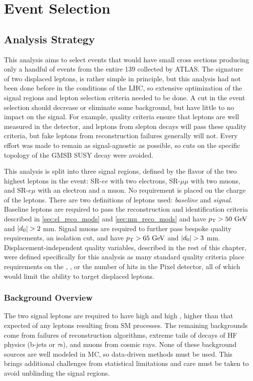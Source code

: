 \chapter{Event Selection}
\label{chap:eventselection}

\section{Analysis Strategy}

This analysis aims to select events that would have small cross sections producing only a handful of events from the entire 139 \ifb collected by \ac{ATLAS}. The signature of two displaced leptons, is rather simple in principle, but this analysis had not been done before in the conditions of the \ac{LHC}, so extensive optimization of the signal regions and lepton selection criteria needed to be done. A cut in the event selection should decrease or eliminate some background, but have little to no impact on the signal. For example, quality criteria ensure that leptons are well measured in the detector, and leptons from slepton decays will pass these quality criteria, but fake leptons from reconstruction failures generally will not. Every effort was made to remain as signal-agnostic as possible, so cuts on the specific topology of the \ac{GMSB} \ac{SUSY} decay were avoided. 

This analysis is split into three signal regions, defined by the flavor of the two highest \pt leptons in the event: SR-$ee$ with two electrons, SR-$\mu\mu$ with two muons, and SR-$e\mu$ with an electron and a muon. No requirement is placed on the charge of the leptons.
There are two definitions of leptons used: \emph{baseline} and \emph{signal}. Baseline leptons are required to pass the reconstruction and identification criteria described in \autoref{sec:el_reco_mods} and \autoref{sec:mu_reco_mods} and have $\pt > 50 \GeV$ and $|d_0| > 2$ mm. Signal muons are required to further pass bespoke quality requirements, an isolation cut, and have $\pt > 65 \GeV$ and $|d_0| > 3$ mm. Displacement-independent quality variables, described in the rest of this chapter, were defined specifically for this analysis as many standard quality criteria place requirements on the \absdz, \absz, or the number of hits in the Pixel detector, all of which would limit the ability to target displaced leptons.

\subsection{Background Overview}
The two signal leptons are required to have high \pt and high \absdz, higher than that expected of any leptons resulting from \ac{SM} processes. The remaining backgrounds come from failures of reconstruction algorithms, extreme tails of decays of \acf{HF} physics (b-jets or $\tau$s), and muons from cosmic rays. None of these background sources are well modeled in \ac{MC}, so data-driven methods must be used. This brings additional challenges from statistical limitations and care must be taken to avoid unblinding the signal regions.

